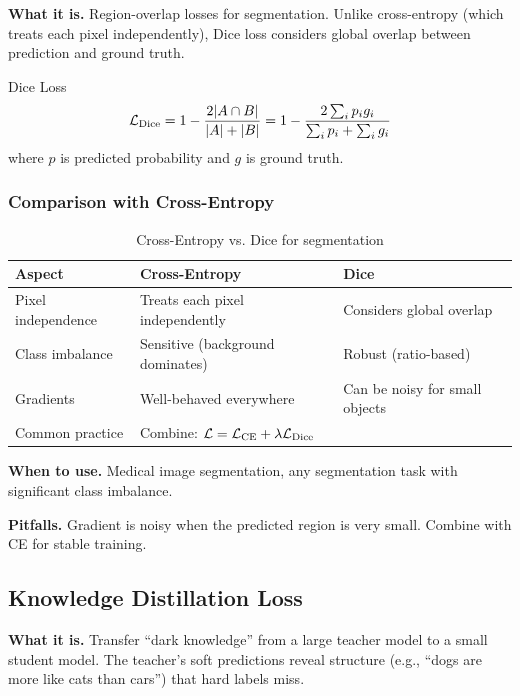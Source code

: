 \textbf{What it is.} Region-overlap losses for segmentation. Unlike cross-entropy (which treats each pixel independently), Dice loss considers global overlap between prediction and ground truth.

\begin{mathresult}{Dice Loss}
\begin{equation}
\mathcal{L}_{\text{Dice}} = 1 - \frac{2|A \cap B|}{|A| + |B|} = 1 - \frac{2\sum_i p_i g_i}{\sum_i p_i + \sum_i g_i}
\end{equation}
where $p$ is predicted probability and $g$ is ground truth.
\end{mathresult}

\subsubsection{Comparison with Cross-Entropy}

\begin{table}[H]
\centering
\caption{Cross-Entropy vs. Dice for segmentation}
\begin{tabularx}{\textwidth}{lXX}
\toprule
\textbf{Aspect} & \textbf{Cross-Entropy} & \textbf{Dice} \\
\midrule
Pixel independence & Treats each pixel independently & Considers global overlap \\
Class imbalance & Sensitive (background dominates) & Robust (ratio-based) \\
Gradients & Well-behaved everywhere & Can be noisy for small objects \\
Common practice & Combine: $\mathcal{L} = \mathcal{L}_{\text{CE}} + \lambda\mathcal{L}_{\text{Dice}}$ & \\
\bottomrule
\end{tabularx}
\end{table}

\textbf{When to use.} Medical image segmentation, any segmentation task with significant class imbalance.

\textbf{Pitfalls.} Gradient is noisy when the predicted region is very small. Combine with CE for stable training.

\subsection{Knowledge Distillation Loss}

\textbf{What it is.} Transfer ``dark knowledge'' from a large teacher model to a small student model. The teacher's soft predictions reveal structure (e.g., ``dogs are more like cats than cars'') that hard labels miss.

